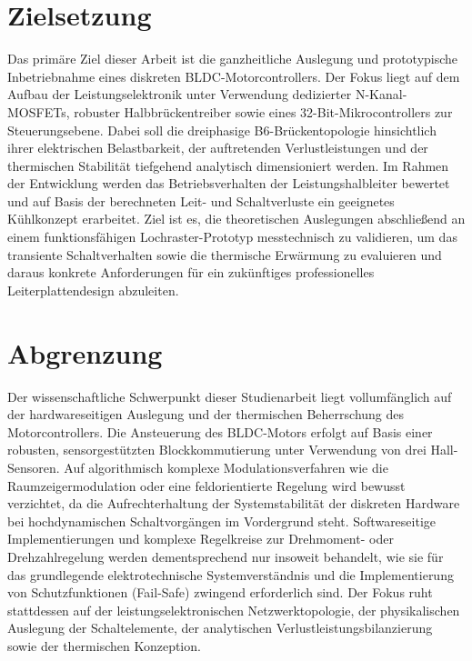 \section{Zielsetzung}

Das primäre Ziel dieser Arbeit ist die ganzheitliche Auslegung und prototypische Inbetriebnahme eines diskreten BLDC-Motorcontrollers. Der Fokus liegt auf dem Aufbau der Leistungselektronik unter Verwendung dedizierter N-Kanal-MOSFETs, robuster Halbbrückentreiber sowie eines 32-Bit-Mikrocontrollers zur Steuerungsebene. Dabei soll die dreiphasige B6-Brückentopologie hinsichtlich ihrer elektrischen Belastbarkeit, der auftretenden Verlustleistungen und der thermischen Stabilität tiefgehend analytisch dimensioniert werden. Im Rahmen der Entwicklung werden das Betriebsverhalten der Leistungshalbleiter bewertet und auf Basis der berechneten Leit- und Schaltverluste ein geeignetes Kühlkonzept erarbeitet. Ziel ist es, die theoretischen Auslegungen abschließend an einem funktionsfähigen Lochraster-Prototyp messtechnisch zu validieren, um das transiente Schaltverhalten sowie die thermische Erwärmung zu evaluieren und daraus konkrete Anforderungen für ein zukünftiges professionelles Leiterplattendesign abzuleiten.

\section{Abgrenzung}

Der wissenschaftliche Schwerpunkt dieser Studienarbeit liegt vollumfänglich auf der hardwareseitigen Auslegung und der thermischen Beherrschung des Motorcontrollers. Die Ansteuerung des BLDC-Motors erfolgt auf Basis einer robusten, sensorgestützten Blockkommutierung unter Verwendung von drei Hall-Sensoren. Auf algorithmisch komplexe Modulationsverfahren wie die Raumzeigermodulation oder eine feldorientierte Regelung wird bewusst verzichtet, da die Aufrechterhaltung der Systemstabilität der diskreten Hardware bei hochdynamischen Schaltvorgängen im Vordergrund steht. Softwareseitige Implementierungen und komplexe Regelkreise zur Drehmoment- oder Drehzahlregelung werden dementsprechend nur insoweit behandelt, wie sie für das grundlegende elektrotechnische Systemverständnis und die Implementierung von Schutzfunktionen (Fail-Safe) zwingend erforderlich sind. Der Fokus ruht stattdessen auf der leistungselektronischen Netzwerktopologie, der physikalischen Auslegung der Schaltelemente, der analytischen Verlustleistungsbilanzierung sowie der thermischen Konzeption.


